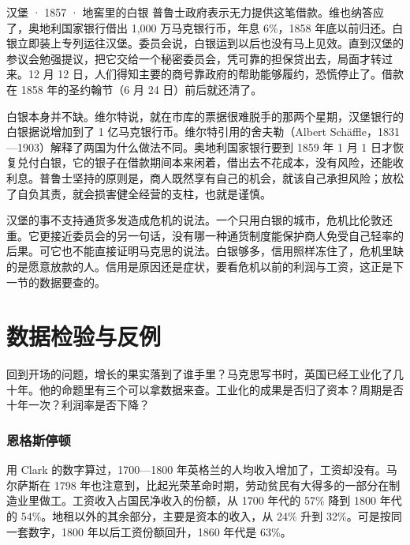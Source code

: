 \begin{case}{汉堡 · 1857 · 地窖里的白银}
普鲁士政府表示无力提供这笔借款\cite{wirth1858}。维也纳答应了，奥地利国家银行借出 1,000 万马克银行币，年息 6\%，1858 年底以前归还\cite{wirth1858}。白银立即装上专列运往汉堡\cite{wirth1858}。委员会说，白银运到以后也没有马上见效。直到汉堡的参议会勉强提议，把它交给一个秘密委员会，凭可靠的担保贷出去，局面才转过来\cite{evans1859}。12 月 12 日，人们得知主要的商号靠政府的帮助能够履约，恐慌停止了\cite{evans1859}。借款在 1858 年的圣约翰节（6 月 24 日）前后就还清了\cite{wirth1858}。

白银本身并不缺。维尔特说，就在市库的票据很难脱手的那两个星期，汉堡银行的白银据说增加到了 1 亿马克银行币\cite{wirth1858}。维尔特引用的舍夫勒（Albert Schäffle，1831—1903）解释了两国为什么做法不同\cite{wirth1858}。奥地利国家银行要到 1859 年 1 月 1 日才恢复兑付白银，它的银子在借款期间本来闲着，借出去不花成本，没有风险，还能收利息\cite{wirth1858}。普鲁士坚持的原则是，商人既然享有自己的机会，就该自己承担风险；放松了自负其责，就会损害健全经营的支柱，也就是谨慎\cite{wirth1858}。
\end{case}

汉堡的事不支持通货多发造成危机的说法。一个只用白银的城市，危机比伦敦还重。它更接近委员会的另一句话，没有哪一种通货制度能保护商人免受自己轻率的后果。可它也不能直接证明马克思的说法。白银够多，信用照样冻住了，危机里缺的是愿意放款的人。信用是原因还是症状，要看危机以前的利润与工资，这正是下一节的数据要查的。

\section{数据检验与反例}\label{sec:marx-test}

回到开场的问题，增长的果实落到了谁手里？马克思写书时，英国已经工业化了几十年。他的命题里有三个可以拿数据来查。工业化的成果是否归了资本？周期是否十年一次？利润率是否下降？

\subsubsection{恩格斯停顿}
用 Clark 的数字算过，1700—1800 年英格兰的人均收入增加了，工资却没有。马尔萨斯在 1798 年也注意到，比起光荣革命时期，劳动贫民有大得多的一部分在制造业里做工\cite{malthus1798}。工资收入占国民净收入的份额，从 1700 年代的 57\% 降到 1800 年代的 54\%。地租以外的其余部分，主要是资本的收入，从 24\% 升到 32\%\cite{clark2010}。可是按同一套数字，1800 年以后工资份额回升，1860 年代是 63\%\cite{clark2010}。

